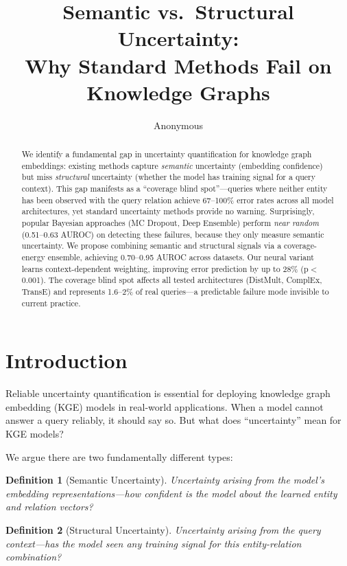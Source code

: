 \documentclass{article}
\title{Semantic vs.\ Structural Uncertainty: \\Why Standard Methods Fail on Knowledge Graphs}
\author{Anonymous}
\date{}
\newtheorem{definition}{Definition}
\begin{document}
\maketitle

\begin{abstract}
We identify a fundamental gap in uncertainty quantification for knowledge graph embeddings: existing methods capture \emph{semantic} uncertainty (embedding confidence) but miss \emph{structural} uncertainty (whether the model has training signal for a query context).
This gap manifests as a ``coverage blind spot''---queries where neither entity has been observed with the query relation achieve 67--100\% error rates across all model architectures, yet standard uncertainty methods provide no warning.
Surprisingly, popular Bayesian approaches (MC Dropout, Deep Ensemble) perform \emph{near random} (0.51--0.63 AUROC) on detecting these failures, because they only measure semantic uncertainty.
We propose combining semantic and structural signals via a coverage-energy ensemble, achieving 0.70--0.95 AUROC across datasets.
Our neural variant learns context-dependent weighting, improving error prediction by up to 28\% (p$<$0.001).
The coverage blind spot affects all tested architectures (DistMult, ComplEx, TransE) and represents 1.6--2\% of real queries---a predictable failure mode invisible to current practice.
\end{abstract}

\section{Introduction}

Reliable uncertainty quantification is essential for deploying knowledge graph embedding (KGE) models in real-world applications.
When a model cannot answer a query reliably, it should say so.
But what does ``uncertainty'' mean for KGE models?

We argue there are two fundamentally different types:

\begin{definition}[Semantic Uncertainty]
Uncertainty arising from the model's embedding representations---how confident is the model about the learned entity and relation vectors?
\end{definition}

\begin{definition}[Structural Uncertainty]
Uncertainty arising from the query context---has the model seen \emph{any} training signal for this entity-relation combination?
\end{definition}
\end{document}
